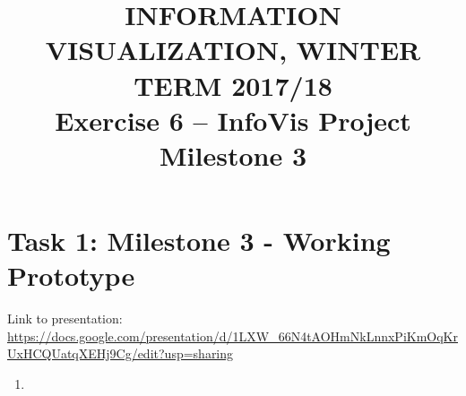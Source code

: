\documentclass[11pt, twoside, BCOR=8mm, DIV=12]{scrartcl}
\title{{\Large INFORMATION VISUALIZATION, WINTER TERM 2017/18} \\ Exercise 6 – InfoVis Project Milestone 3}
\begin{document}
\maketitle
\section*{Task 1: Milestone 3 - Working Prototype}
Link to presentation: \\ \url{https://docs.google.com/presentation/d/1LXW_66N4tAOHmNkLnnxPiKmOqKrUxHCQUatqXEHj9Cg/edit?usp=sharing}
\begin{enumerate}[label=\alph*)]
\item
\end{enumerate}
\end{document}

